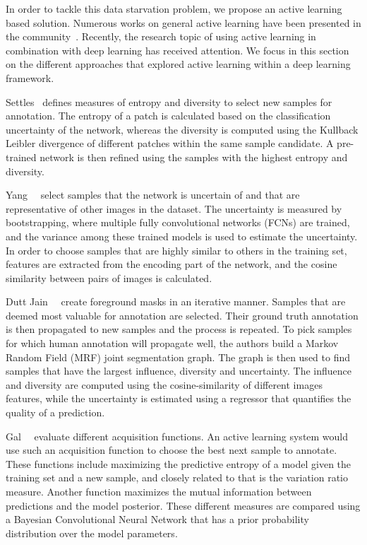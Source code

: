 In order to tackle this data starvation problem, we propose an active learning based solution. Numerous works on general active learning have been presented in the community~\cite{settles2009active,guyon2011results,holub2008entropy}. Recently, the research topic of using active learning in combination with deep learning has received attention. We focus in this section on the different approaches that explored active learning within a deep learning framework.

Settles~\cite{zhou2017fine} defines measures of entropy and diversity to select new samples for annotation. The entropy of a patch is calculated based on the classification uncertainty of the network, whereas the diversity is computed using the Kullback Leibler divergence of different patches within the same sample candidate. A pre-trained network is then refined using the samples with the highest entropy and diversity.

Yang~\etal~\cite{yang2017suggestive} select samples that the network is uncertain of and that are representative of other images in the dataset. The uncertainty is measured by bootstrapping, where multiple fully convolutional networks (FCNs) are trained, and the variance among  these trained models is used to estimate the uncertainty. In order to choose samples that are highly similar to others in the training set, features are extracted from the encoding part of the network, and the cosine similarity between pairs of images is calculated. 

Dutt Jain~\etal~\cite{dutt2016active} create foreground masks in an iterative manner. Samples that are deemed most valuable for annotation are selected. Their ground truth annotation is then propagated to new samples and the process is repeated. To pick samples for which human annotation will propagate well, the authors build a Markov Random Field (MRF) joint segmentation graph. The graph is then used to find samples that have the largest influence, diversity and uncertainty. The influence and diversity are computed using the cosine-similarity of different images features, while the uncertainty is estimated using a regressor that quantifies the quality of a prediction. 

Gal~\etal~\cite{gal2017deep} evaluate different acquisition functions. An active learning system would use such an acquisition function to choose the best next sample to annotate. These functions include maximizing the predictive entropy of a model given the training set and a new sample, and closely related to that is the variation ratio measure. Another function maximizes the mutual information between predictions and the model posterior. These different measures are compared using a Bayesian Convolutional Neural Network that has a prior probability distribution over the model parameters.  

